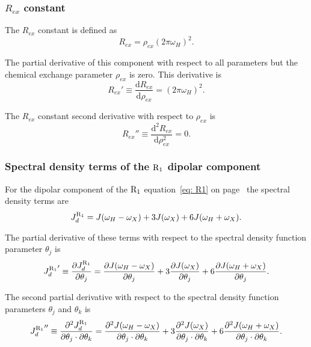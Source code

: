 \subsubsection{$R_{ex}$ constant}

The $R_{ex}$ constant is defined as
\begin{equation}
    R_{ex} = \rho_{ex} (2 \pi \omega_H)^2 . \label{eq: Ri': Rex}
\end{equation}

\noindent The partial derivative of this component with respect to all parameters but the chemical exchange parameter $\rho_{ex}$ is zero.  This derivative is
\begin{equation}
    R_{ex}' \equiv \frac{\mathrm{d} R_{ex}}{\mathrm{d} \rho_{ex}} = (2 \pi \omega_H)^2. \label{eq: Ri': Rex'}
\end{equation}

\noindent The $R_{ex}$ constant second derivative with respect to $\rho_{ex}$ is
\begin{equation}
    R_{ex}'' \equiv \frac{\mathrm{d}^2 R_{ex}}{\mathrm{d} \rho_{ex}^2} = 0. \label{eq: Ri': Rex"}
\end{equation}


\subsubsection{Spectral density terms of the $\mathrm{R}_1$ dipolar component}

For the dipolar component of the $\mathrm{R}_1$ equation~\eqref{eq: R1} on page~\pageref{eq: R1} the spectral density terms are
\begin{equation}
    J_d^{\mathrm{R}_1} = J(\omega_H - \omega_X) + 3J(\omega_X) + 6J(\omega_H + \omega_X).  \label{eq: J terms: JR1d}
\end{equation}

\noindent The partial derivative of these terms with respect to the spectral density function parameter $\theta_j$ is
\begin{equation}
    {J_d^{\mathrm{R}_1}}' \equiv \frac{\partial J_d^{\mathrm{R}_1}}{\partial \theta_j}
        = \frac{\partial J(\omega_H - \omega_X)}{\partial \theta_j}
        + 3 \frac{\partial J(\omega_X)}{\partial \theta_j}
        + 6 \frac{\partial J(\omega_H + \omega_X)}{\partial \theta_j}.  \label{eq: J terms: JR1d'}
\end{equation}

\noindent The second partial derivative with respect to the spectral density function parameters $\theta_j$ and $\theta_k$ is
\begin{equation}
    {J_d^{\mathrm{R}_1}}'' \equiv \frac{\partial^2 J_d^{\mathrm{R}_1}}{\partial \theta_j \cdot \partial \theta_k}
        = \frac{\partial^2 J(\omega_H - \omega_X)}{\partial \theta_j \cdot \partial \theta_k}
        + 3 \frac{\partial^2 J(\omega_X)}{\partial \theta_j \cdot \partial \theta_k}
        + 6 \frac{\partial^2 J(\omega_H + \omega_X)}{\partial \theta_j \cdot \partial \theta_k}.  \label{eq: J terms: JR1d"}
\end{equation}


